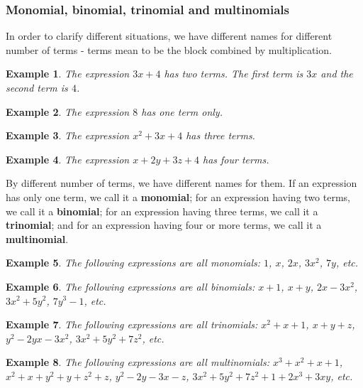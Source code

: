 \documentclass[12pt]{article}
\newtheorem*{example}{Example}
\begin{document}
    \subsubsection*{Monomial, binomial, trinomial and multinomials}

    In order to clarify different situations, we have different names for different number of terms - terms mean to be the block combined by multiplication.

    \begin{example}
        The expression $3x+4$ has two terms. The first term is $3x$ and the second term is $4$.
    \end{example}

    \begin{example}
        The expression $8$ has one term only.
    \end{example}

    \begin{example}
        The expression $x^2+3x+4$ has three terms.
    \end{example}

    \begin{example}
        The expression $x+2y+3z+4$ has four terms.
    \end{example}

    By different number of terms, we have different names for them. If an expression has only one term, we call it a \textbf{monomial}; for an expression having two terms, we call it a \textbf{binomial}; for an expression having three terms, we call it a \textbf{trinomial}; and for an expression having four or more terms, we call it a \textbf{multinomial}.

    \begin{example}
        The following expressions are all monomials: $1$, $x$, $2x$, $3x^2$, $7y$, etc.
    \end{example}

    \begin{example}
        The following expressions are all binomials: $x+1$, $x+y$, $2x-3x^2$, $3x^2+5y^2$, $7y^3-1$, etc.
    \end{example}

    \begin{example}
        The following expressions are all trinomials: $x^2+x+1$, $x+y+z$, $y^2-2yx-3x^2$, $3x^2+5y^2+7z^2$, etc.
    \end{example}

    \begin{example}
        The following expressions are all multinomials: $x^3+x^2+x+1$, $x^2+x+y^2+y+z^2+z$, $y^2-2y-3x-z$, $3x^2+5y^2+7z^2+1+2x^3+3xy$, etc.
    \end{example}
\end{document}
